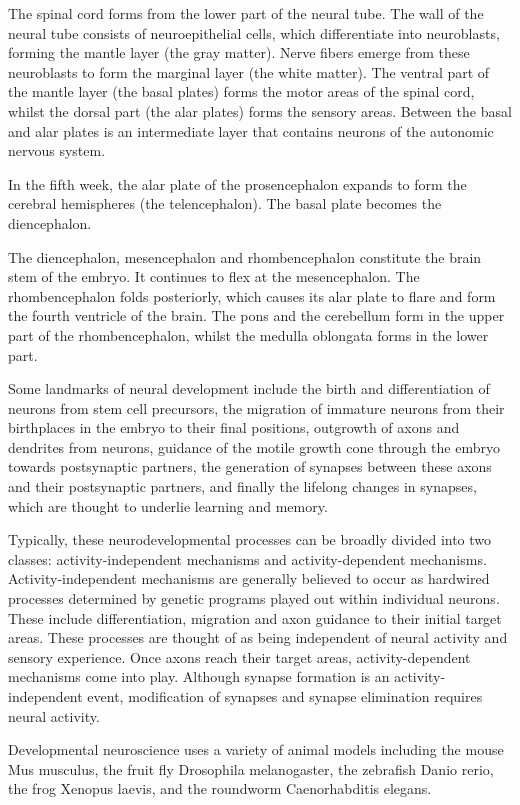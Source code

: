 The spinal cord forms from the lower part of the neural tube. The wall of the neural tube consists of neuroepithelial cells, which differentiate into neuroblasts, forming the mantle layer (the gray matter). Nerve fibers emerge from these neuroblasts to form the marginal layer (the white matter). The ventral part of the mantle layer (the basal plates) forms the motor areas of the spinal cord, whilst the dorsal part (the alar plates) forms the sensory areas. Between the basal and alar plates is an intermediate layer that contains neurons of the autonomic nervous system.

In the fifth week, the alar plate of the prosencephalon expands to form the cerebral hemispheres (the telencephalon). The basal plate becomes the diencephalon.

The diencephalon, mesencephalon and rhombencephalon constitute the brain stem of the embryo. It continues to flex at the mesencephalon. The rhombencephalon folds posteriorly, which causes its alar plate to flare and form the fourth ventricle of the brain. The pons and the cerebellum form in the upper part of the rhombencephalon, whilst the medulla oblongata forms in the lower part.

Some landmarks of neural development include the birth and differentiation of neurons from stem cell precursors, the migration of immature neurons from their birthplaces in the embryo to their final positions, outgrowth of axons and dendrites from neurons, guidance of the motile growth cone through the embryo towards postsynaptic partners, the generation of synapses between these axons and their postsynaptic partners, and finally the lifelong changes in synapses, which are thought to underlie learning and memory.

Typically, these neurodevelopmental processes can be broadly divided into two classes: activity-independent mechanisms and activity-dependent mechanisms. Activity-independent mechanisms are generally believed to occur as hardwired processes determined by genetic programs played out within individual neurons. These include differentiation, migration and axon guidance to their initial target areas. These processes are thought of as being independent of neural activity and sensory experience. Once axons reach their target areas, activity-dependent mechanisms come into play. Although synapse formation is an activity-independent event, modification of synapses and synapse elimination requires neural activity.

Developmental neuroscience uses a variety of animal models including the mouse Mus musculus, the fruit fly Drosophila melanogaster, the zebrafish Danio rerio, the frog Xenopus laevis, and the roundworm Caenorhabditis elegans.

